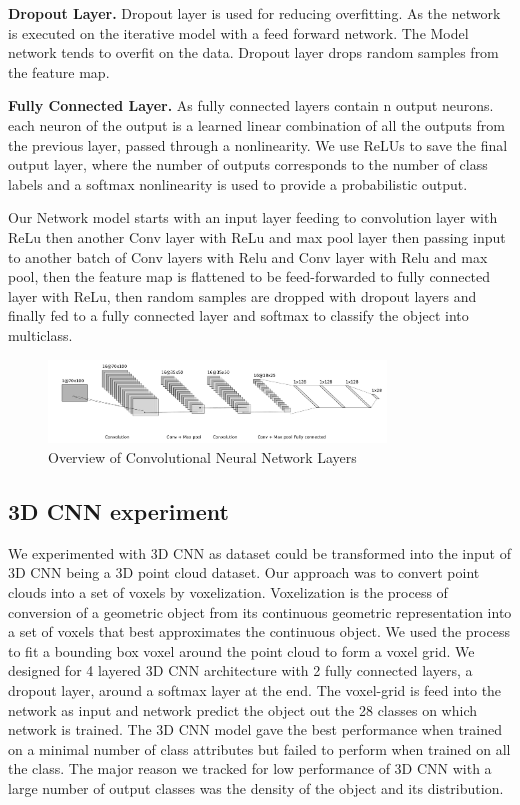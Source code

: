 \textbf{Dropout Layer.}
Dropout layer is used for reducing overfitting. As the network is executed on the iterative model with a feed forward network.
The Model network tends to overfit on the data. Dropout layer drops random samples from the feature map.

\textbf{Fully Connected Layer.}
As fully connected layers contain n output neurons.
each neuron of the output is a learned linear combination of all the outputs from the previous layer,
passed through a nonlinearity.
We use ReLUs to save the final output layer, where the number of outputs corresponds
to the number of class labels and a softmax nonlinearity is used to provide a probabilistic output.


Our Network model starts with an input layer feeding to convolution layer with ReLu then
another Conv layer with ReLu and max pool layer then passing input to another batch of Conv layers
with Relu and Conv layer with Relu and max pool, then the feature map is flattened to be feed-forwarded to
fully connected layer with ReLu, then random samples are dropped with dropout layers
and finally fed to a fully connected layer and softmax to classify the object into multiclass.

\begin{figure}[!h]
     \begin{center}
       \includegraphics[width=0.8\textwidth]{./images/object_net.pdf}
       \caption{Overview of Convolutional Neural Network Layers}
       \label{fig:cnn}
     \end{center}
\end{figure}

\subsection{3D CNN experiment}
We experimented with 3D CNN as dataset could be transformed into the input of 3D CNN being a 3D point cloud dataset. 
Our approach was to convert point clouds into a set of voxels by voxelization. Voxelization is the process of conversion 
of a geometric object from its
continuous geometric representation into a set of voxels that best approximates the continuous
object. We used the process to fit a bounding box voxel around the point cloud to form a voxel grid.
We designed for 4 layered 3D CNN architecture with 2 fully connected layers, a dropout layer, around a softmax layer at the end. 
The voxel-grid is feed into the network as input and network predict the object out the 28 classes on which network is trained. 
The 3D CNN model gave the best performance when trained on a minimal number of class attributes but failed to perform when trained on all the class. 
The major reason we tracked for low performance of 3D CNN with a large number of output classes was the density of the object and its distribution.

